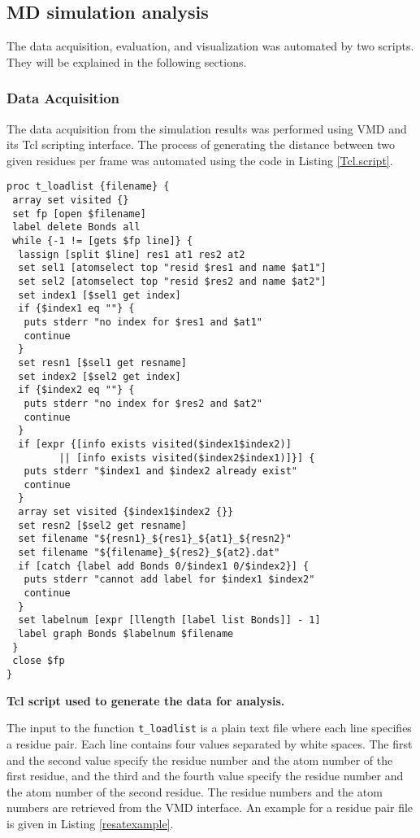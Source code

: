 \documentclass[11pt,twocolumn]{article}
\begin{document}
\subsection*{MD simulation analysis}

The data acquisition, evaluation, and visualization was automated by two scripts. They will be explained in the following  sections.

\subsubsection*{Data Acquisition}

The data acquisition from  the simulation results was performed using VMD and its Tcl scripting interface. The process of generating the distance between two given residues per frame was automated using the code in Listing \ref{Tcl.script}.

\begin{listing}
\begin{verbatim}
proc t_loadlist {filename} {
 array set visited {}
 set fp [open $filename]
 label delete Bonds all
 while {-1 != [gets $fp line]} {
  lassign [split $line] res1 at1 res2 at2
  set sel1 [atomselect top "resid $res1 and name $at1"]
  set sel2 [atomselect top "resid $res2 and name $at2"]
  set index1 [$sel1 get index]
  if {$index1 eq ""} {
   puts stderr "no index for $res1 and $at1"
   continue
  }
  set resn1 [$sel1 get resname]
  set index2 [$sel2 get index]
  if {$index2 eq ""} {
   puts stderr "no index for $res2 and $at2"
   continue
  }
  if [expr {[info exists visited($index1$index2)]
         || [info exists visited($index2$index1)]}] {
   puts stderr "$index1 and $index2 already exist"
   continue
  }
  array set visited {$index1$index2 {}}
  set resn2 [$sel2 get resname]
  set filename "${resn1}_${res1}_${at1}_${resn2}"
  set filename "${filename}_${res2}_${at2}.dat"
  if [catch {label add Bonds 0/$index1 0/$index2}] {
   puts stderr "cannot add label for $index1 $index2"
   continue
  }
  set labelnum [expr [llength [label list Bonds]] - 1] 
  label graph Bonds $labelnum $filename  
 }
 close $fp
}
\end{verbatim}
\caption{\textbf{Tcl script used to generate the data for analysis.}}\label{Tcl.script}
\end{listing}

The input to the function \texttt{t\_loadlist} is a plain text file where each line specifies a residue pair. Each line contains four values separated by white spaces. The first and the second value specify the residue number and the atom number of the first residue, and the third and the fourth value specify the  residue number and the atom number of the second residue. The residue numbers and the atom numbers are retrieved from the VMD interface. An example for a residue pair file is given in Listing \ref{resatexample}.
\end{document}
